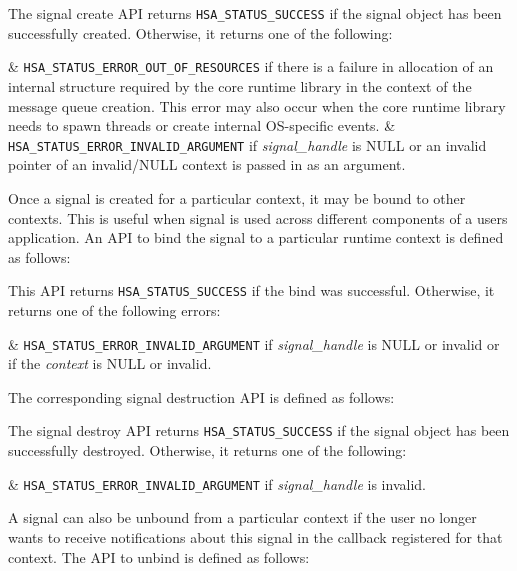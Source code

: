 \documentclass{book}
\newcommand{\diffblock}[1]{#1}
\begin{document}


The signal create API returns \texttt{HSA\_STATUS\_SUCCESS} if the
signal object has been successfully created. Otherwise, it returns
one of the following:

\begin{easylist}
& \texttt{HSA\_STATUS\_ERROR\_OUT\_OF\_RESOURCES} if there is a failure
in allocation of an internal structure required by the core runtime
library in the context of the message queue creation. This error may
also occur when the core runtime library needs to spawn threads or
create internal OS-specific events.
& \texttt{HSA\_STATUS\_ERROR\_INVALID\_ARGUMENT} if {\itshape
\diffblock{signal\_handle}} is NULL or an invalid pointer of an invalid/NULL
context is passed in as an argument.
\end{easylist}

Once a signal is created for a particular context, it may be bound
to other contexts. This is useful when signal is used across
different components of a users application. An API to bind the
signal to a particular runtime context is defined as follows:



This API returns \texttt{HSA\_STATUS\_SUCCESS} if the bind was
successful. Otherwise, it returns one of the following errors:

\begin{easylist}
& \texttt{HSA\_STATUS\_ERROR\_INVALID\_ARGUMENT} if {\itshape
signal\_handle} is NULL or invalid or if the {\itshape context} is
NULL or invalid.
\end{easylist}

The corresponding signal destruction API is defined as follows:


The signal destroy API returns \texttt{HSA\_STATUS\_SUCCESS} if the
signal object has been successfully destroyed. Otherwise, it returns
one of the following:

\begin{easylist}
& \texttt{HSA\_STATUS\_ERROR\_INVALID\_ARGUMENT} if {\itshape
signal\_handle} is invalid.
\end{easylist}

A signal can also be unbound from a particular context if the user
no longer wants to receive notifications about this signal in the
callback registered for that context. The API to unbind is defined
as follows:


\end{document}
